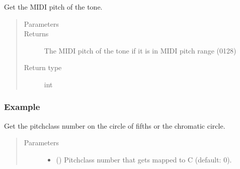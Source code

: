 \documentclass[letterpaper,10pt,english]{sphinxmanual}
\begin{document}
\begin{fulllineitems}
\begin{fulllineitems}
\end{fulllineitems}


\begin{fulllineitems}
\label{\detokenize{api:musictheory.Tone.get_midi_pitch}}
Get the MIDI pitch of the tone.
\begin{quote}\begin{description}
\item[{Parameters}] \leavevmode
{} \textendash{} 

\item[{Returns}] \leavevmode
The MIDI pitch of the tone if it is in MIDI pitch range (0\textendash{}128)

\item[{Return type}] \leavevmode
int

\end{description}\end{quote}
\subsubsection*{Example}

\begin{sphinxVerbatim}[commandchars=\\\{\}]
  
\end{sphinxVerbatim}

\end{fulllineitems}


\begin{fulllineitems}
\label{\detokenize{api:musictheory.Tone.get_pitch_class}}
Get the pitch\sphinxhyphen{}class number on the circle of fifths or the chromatic circle.
\begin{quote}\begin{description}
\item[{Parameters}] \leavevmode\begin{itemize}
\item {} 
 () \textendash{} Pitch\sphinxhyphen{}class number that gets mapped to C (default: 0).


\end{itemize}
\end{description}
\end{quote}
\end{fulllineitems}
\end{fulllineitems}
\end{document}
